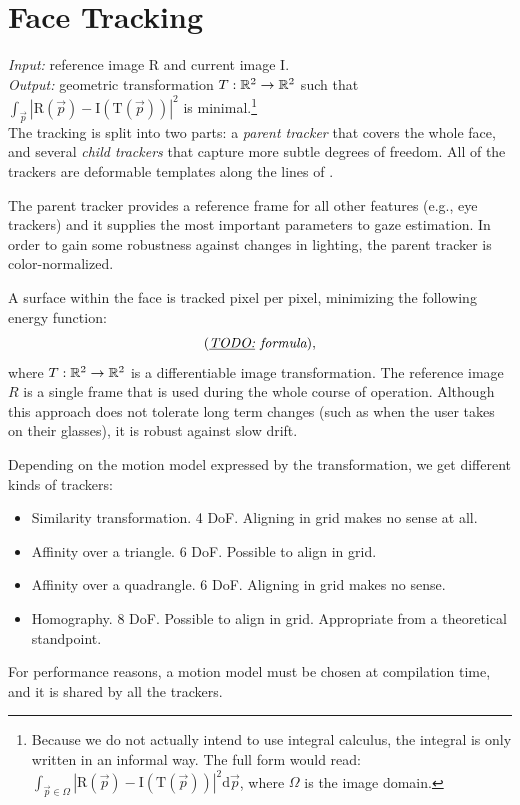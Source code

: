 \section{Face Tracking}

\textit{Input:} reference image $\textrm{R}$ and current image $\textrm{I}$.\\
\textit{Output:} geometric transformation $T: \mathbb{R}^2 \to \mathbb{R}^2$ such that $\int_{\vec p} |\textrm{R}(\vec p) - \textrm{I}(\textrm{T}(\vec p))|^2$ is minimal.\footnote{
Because we do not actually intend to use integral calculus, the integral is only written in an informal way.
The full form would read: $\int_{\vec p \in \Omega} |\textrm{R}(\vec p) - \textrm{I}(\textrm{T}(\vec p))|^2 \mathrm{d}\vec p$, where $\Omega$ is the image domain.
}\\

The tracking is split into two parts: a \textit{parent tracker} that covers the whole face, and several \textit{child trackers} that capture more subtle degrees of freedom.
All of the trackers are deformable templates along the lines of .

The parent tracker provides a reference frame for all other features (e.g., eye trackers) and it supplies the most important parameters to gaze estimation.
In order to gain some robustness against changes in lighting, the parent tracker is color-normalized.

A surface within the face is tracked pixel per pixel, minimizing the following energy function:
$$(\textit{\underline{TODO:} formula}),$$
where $T: \mathbb{R}^2 \to \mathbb{R}^2$ is a differentiable image transformation.
The reference image $R$ is a single frame that is used during the whole course of operation.
Although this approach does not tolerate long term changes (such as when the user takes on their glasses), it is robust against slow drift.

Depending on the motion model expressed by the transformation, we get different kinds of trackers:
\begin{itemize}
\item Similarity transformation. 4 DoF. Aligning in grid makes no sense at all.
\item Affinity over a triangle. 6 DoF. Possible to align in grid.
\item Affinity over a quadrangle. 6 DoF. Aligning in grid makes no sense.
\item Homography. 8 DoF. Possible to align in grid. Appropriate from a theoretical standpoint.
\end{itemize}
For performance reasons, a motion model must be chosen at compilation time, and it is shared by all the trackers.

